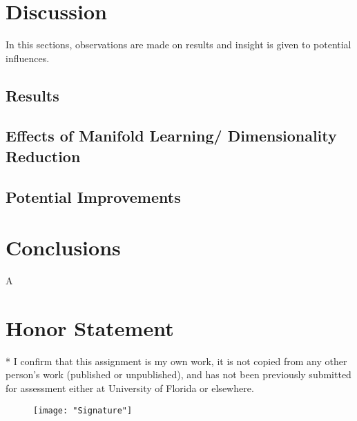 \documentclass[conference]{IEEEtran}
\begin{document}

\section{Discussion} \label{Discussion}
In this sections, observations are made on results and insight is given to potential influences.

\subsection{Results}

\subsection{Effects of Manifold Learning/ Dimensionality Reduction}


\subsection{Potential Improvements}



\section{Conclusions} \label{Conclusions}
A

\section*{Honor Statement}
\noindent
* I confirm that this assignment is my own work, it is not copied from any other person's work (published or unpublished), and has not been previously submitted for assessment either at University of Florida or elsewhere.

\begin{figure}[h!]
	\centering
	\texttt{[image: "Signature"]}
\end{figure}



%
\end{document}
